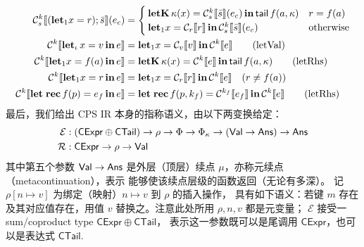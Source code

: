 \begin{align*}
  \mathcal{C}_s^k\llbracket (\mathbf{let}_1 x = r); \bar{s} \rrbracket(e_c) &=
  \begin{cases}
    \mathbf{letK}\, \kappa(x) = \mathcal{C}_s^k\llbracket \bar{s} \rrbracket(e_c)\, \mathbf{in}\, \mathsf{tail}\, f(a, \kappa)
    & r = f(a) \\
    \mathbf{let}_1 x = \mathcal{C}_r\llbracket r \rrbracket\, \mathbf{in}\, \mathcal{C}_s^k\llbracket \bar{s} \rrbracket(e_c)
    & \text{otherwise}
  \end{cases}\\
  \mathcal{C}^k\llbracket \mathbf{let}_\iota\, x = v\, \mathbf{in}\, e \rrbracket &=
  \mathbf{let}_1 x = \mathcal{C}_v\llbracket v \rrbracket\, \mathbf{in}\, \mathcal{C}^k\llbracket e \rrbracket \tag{letVal} \\
  \mathcal{C}^k\llbracket \mathbf{let}_1 x = f(a)\, \mathbf{in}\, e \rrbracket &=
  \mathbf{letK}\, \kappa(x) = \mathcal{C}^k\llbracket e \rrbracket\, \mathbf{in}\, \mathsf{tail}\, f(a, \kappa) \tag{letRhs} \\
  \mathcal{C}^k\llbracket \mathbf{let}_1 x = r\, \mathbf{in}\, e \rrbracket &=
  \mathbf{let}_1 x = \mathcal{C}_r\llbracket r \rrbracket\, \mathbf{in}\, \mathcal{C}^k\llbracket e \rrbracket
  \quad (r \neq f(a)) \\
  \mathcal{C}^k\llbracket \mathbf{let\;rec}\, f(p) = e_f\, \mathbf{in}\, e \rrbracket &=
  \mathbf{let\;rec}\, f(p, k_f) = \mathcal{C}^{k_f}\llbracket e_f \rrbracket\, \mathbf{in}\, \mathcal{C}^k\llbracket e \rrbracket \tag{letRhs}
\end{align*}
\endgroup
最后，我们给出 CPS IR 本身的指称语义，由以下两变换给定：
\begingroup
\begin{equation}
  \begin{aligned}
    \mathcal{E} &: (\mathsf{CExpr}\oplus\mathsf{CTail}) \to \rho \to \Phi \to \Phi_\kappa \to (\mathsf{Val} \to \mathsf{Ans}) \to \mathsf{Ans}\\
    \mathcal{R} &: \mathsf{CExpr}\to\rho\to\mathsf{Val}
  \end{aligned}
\end{equation}
\endgroup
其中第五个参数 $\mathsf{Val}\to\mathsf{Ans}$ 是外层（顶层）续点 $\mu$，亦称元续点（metacontinuation），表示
能够使该续点层级的函数返回（无论有多深）。
记 $\rho[n\mapsto v]$ 为绑定（映射）$n\mapsto v$ 到 $\rho$ 的插入操作，
具有如下语义：若键 $m$ 存在及其对应值存在，用值 $v$ 替换之。注意此处所用 $\rho,n,v$ 都是元变量；
$\mathcal{E}$ 接受一 sum/coproduct type $\mathsf{CExpr}\oplus\mathsf{CTail}$，
表示这一参数既可以是尾调用 $\mathsf{CExpr}$，也可以是表达式 $\mathsf{CTail}$.
\begingroup\allowdisplaybreaks
